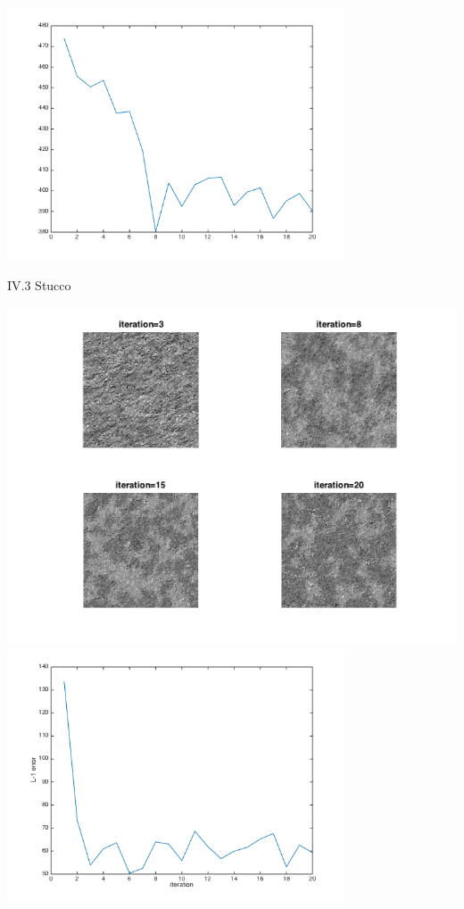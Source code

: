 \documentclass[12pt]{article}
\newenvironment{problem}[2][Part]{\begin{trivlist}
\item[\hskip \labelsep {\bfseries #1}\hskip \labelsep {\bfseries #2}]}{\end{trivlist}}
\begin{document}
\begin{problem}{IV Results}
\begin{center}
	\includegraphics[width=10cm]{Code/Results/grass_error.png}
\end{center}
\item{IV.3 Stucco}
\begin{center}
	\includegraphics[width=14cm]{Code/Results/stucco.png}
	\includegraphics[width=10cm]{Code/Results/stucco_error.png}

\end{center}
\end{problem}
\end{document}
